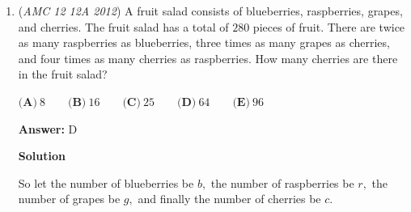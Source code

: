 \begin{enumerate}
\textbf{Solution 1}

Assume that there are 5 total marbles in the bag. The actual number does not matter, since all we care about is the ratios, and the only operation performed on the marbles in the bag is doubling.

 There are 3 blue marbles in the bag and 2 red marbles. If you double the amount of red marbles, there will still be 3 blue marbles but now there will be 4 red marbles. Thus, the answer is $\boxed{\textbf{(C)}\ \frac{4}{7}}$.

 



\textbf{Solution 2}

Let us say that there are $x$ marbles in the bag. Therefore, $\frac{3x}{5x}$ are blue, and $\frac{2x}{5x}$ are red. When the red marbles are doubled, we now have $\frac{2*2x}{5x+2x} = \frac{4x}{7x} = \frac{4}{7} \Rightarrow \boxed{\textbf{(C)}}$




\textbf{Solution 3}

Suppose there are $5$ marbles in total. Since $\frac{3}{5}$ are blue, there are $3$ blue marbles and $2$ red marbles.

 If the number of red marbles is doubled, then the number of red marbles becomes $4$, while the number of blue marbles remains $3$.

 Thus the new total number of marbles is $3+4=7$, and the fraction of marbles that are red is

 $\frac{4}{7}$.

 Therefore, the answer is $\boxed{\frac{4}{7}}$.

 $\text{(Solution by Trashboycan)}$



	\item (\textit{AMC 12 12A 2012}) A fruit salad consists of blueberries, raspberries, grapes, and cherries.  The fruit salad has a total of $280$ pieces of fruit.  There are twice as many raspberries as blueberries, three times as many grapes as cherries, and four times as many cherries as raspberries.  How many cherries are there in the fruit salad?


 $\textbf{(A)}\ 8\qquad\textbf{(B)}\ 16\qquad\textbf{(C)}\ 25\qquad\textbf{(D)}\ 64\qquad\textbf{(E)}\ 96$

 \textbf{Answer: }D



\textbf{Solution}

So let the number of blueberries be $b,$ the number of raspberries be $r,$ the number of grapes be $g,$ and finally the number of cherries be $c.$


\end{enumerate}
